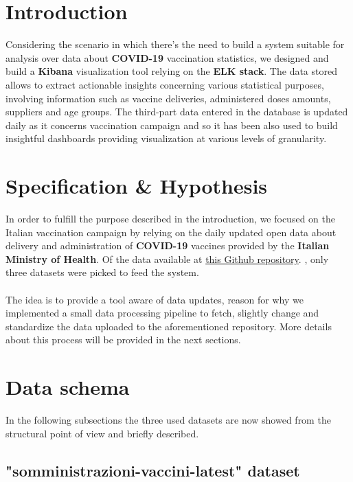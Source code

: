 \documentclass{article}[IEEEtran]
\begin{document}
\section{Introduction}\label{sec:intro}

Considering the scenario in which there’s the need to build a system suitable for analysis over data about \textbf{COVID-19} vaccination statistics, we designed and build a \textbf{Kibana}\cite{b4} visualization tool relying on the \textbf{ELK stack}\cite{b2}.
The data stored allows to extract actionable insights concerning various statistical purposes, involving information such as vaccine deliveries, administered doses amounts, suppliers and age groups. The third-part data entered in the database is updated daily as it concerns vaccination campaign and so it has been also used to build insightful dashboards providing visualization at various levels of granularity.

\section{Specification \& Hypothesis}\label{sec:spec-hyp}
In order to fulfill the purpose described in the introduction, we focused on the Italian vaccination campaign by relying on the daily updated open data about delivery and administration of \textbf{COVID-19 }vaccines provided by the \textbf{Italian Ministry of Health}. Of the data available at \href{https://github.com/italia/covid19-opendata-vaccini}{this Github repository}. , only three datasets were picked to feed the system. \\\\
The idea is to provide a tool aware of data updates, reason for why we implemented a small data processing pipeline to fetch, slightly change and standardize the data uploaded to the aforementioned repository. More details about this process will be provided in the next sections.

\section{Data schema}\label{sec:data-schema}

In the following subsections the three used datasets are now showed from the structural point of view and briefly described.

\subsection{"somministrazioni-vaccini-latest" dataset}
\end{document}
